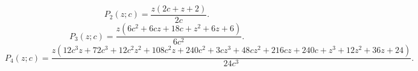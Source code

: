 \[P_{2}(z;c)=\frac{z \left(2 c + z + 2\right)}{2 c}.\]
\[P_{3}(z;c)=\frac{z \left(6 c^{2} + 6 c z + 18 c + z^{2} + 6 z + 6\right)}{6 c^{2}}.\]
\[P_{4}(z;c)=\frac{z \left(12 c^{3} z + 72 c^{3} + 12 c^{2} z^{2} + 108 c^{2} z + 240 c^{2} + 3 c z^{3} + 48 c z^{2} + 216 c z + 240 c + z^{3} + 12 z^{2} + 36 z + 24\right)}{24 c^{3}}.\]

